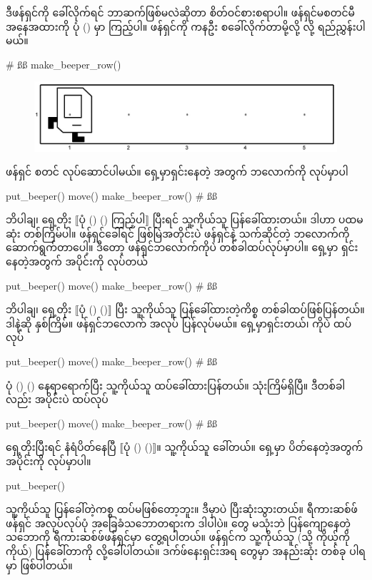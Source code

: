 ဒီဖန်ရှင်ကို ခေါ်လိုက်ရင် ဘာဆက်ဖြစ်မလဲဆိုတာ စိတ်ဝင်စားစရာပါ။  ဖန်ရှင်မစတင်မီ အနေအထားကို ပုံ  (\fRefNo{\ref{fig:mrofb_recur1}}) မှာ ကြည့်ပါ။ ဖန်ရှင်ကို ကနဦး  စခေါ်လိုက်တာမို့လို့  လို့ ရည်ညွှန်းပါမယ်။
%
\begin{py}
# ßß
make_beeper_row()
\end{py}
%
\begin{figure}[htb!]
    {\includegraphics[scale=0.15]{images/ch04/mrofb/before.jpg}}
\caption{}
\label{fig:mrofb_recur1}
\end{figure}

ဖန်ရှင် စတင် လုပ်ဆောင်ပါမယ်။  ရှေ့မှာရှင်းနေတဲ့ အတွက်  ဘလောက်ကို လုပ်မှာပါ
%
\begin{py}
put_beeper()
move()
make_beeper_row() # ßß
\end{py}
%
ဘိပါချ၊ ရှေ့တိုး $\big\llbracket$ပုံ (\fRefNo{\ref{fig:mrofb_recur}}) ()  ကြည့်ပါ$\big\rrbracket$ ပြီးရင် သူ့ကိုယ်သူ  ပြန်ခေါ်ထားတယ်။ ဒါဟာ ပထမဆုံး တစ်ကြိမ်ပါ။ ဖန်ရှင်ခေါ်ရင် ဖြစ်မြဲအတိုင်းပဲ ဖန်ရှင်နဲ့ သက်ဆိုင်တဲ့ ဘလောက်ကို ဆောက်ရွက်တာပေါ့။ ဒီတော့  ဖန်ရှင်ဘလောက်ကိုပဲ တစ်ခါထပ်လုပ်မှာပါ။ ရှေ့မှာ ရှင်းနေတဲ့အတွက်  အပိုင်းကို လုပ်တယ်
%
\begin{py}
put_beeper()
move()
make_beeper_row() # ßß
\end{py}
%
ဘိပါချ၊ ရှေ့တိုး $\big\llbracket$ပုံ (\fRefNo{\ref{fig:mrofb_recur}}) ()$\big\rrbracket$ ပြီး သူ့ကိုယ်သူ ပြန်ခေါ်ထားတဲ့ကိစ္စ တစ်ခါထပ်ဖြစ်ပြန်တယ်။ ဒါနဲ့ဆို နှစ်ကြိမ်။ ဖန်ရှင်ဘလောက် အလုပ် ပြန်လုပ်မယ်။ ရှေ့မှာရှင်းတယ်၊  ကိုပဲ ထပ်လုပ်
%
\begin{py}
put_beeper()
move()
make_beeper_row() # ßß
\end{py}
%
ပုံ (\fRefNo{\ref{fig:mrofb_recur}}) () နေရာရောက်ပြီး သူ့ကိုယ်သူ ထပ်ခေါ်ထားပြန်တယ်။ သုံးကြိမ်ရှိပြီ။ ဒီတစ်ခါလည်း  အပိုင်းပဲ ထပ်လုပ်
%
\begin{py}
put_beeper()
move()
make_beeper_row() # ßß
\end{py}
%
ရှေ့တိုးပြီးရင် နံရံပိတ်နေပြီ $\big\llbracket$ပုံ (\fRefNo{\ref{fig:mrofb_recur}}) ()$\big\rrbracket$။ သူ့ကိုယ်သူ ခေါ်တယ်။ ရှေ့မှာ ပိတ်နေတဲ့အတွက်  အပိုင်းကို လုပ်မှာပါ။
%
\begin{py}
put_beeper()
\end{py}
%
သူ့ကိုယ်သူ ပြန်ခေါ်တဲ့ကစ္စ ထပ်မဖြစ်တော့ဘူး။ ဒီမှာပဲ ပြီးဆုံးသွားတယ်။ ရီကားဆစ်ဖ် ဖန်ရှင် အလုပ်လုပ်ပုံ အခြေခံသဘောတရားက ဒါပါပဲ။  တွေ မသုံးဘဲ ပြန်ကျော့နေတဲ့ သဘောကို ရီကားဆစ်ဖ်ဖန်ရှင်မှာ တွေ့ရပါတယ်။ ဖန်ရှင်က သူ့ကိုယ်သူ (သို့ ကိုယ့်ကိုကိုယ်) ပြန်ခေါ်တာကို  လို့ခေါ်ပါတယ်။ ဒက်ဖ်နေးရှင်းအရ  တွေမှာ  အနည်းဆုံး တစ်ခု ပါရမှာ ဖြစ်ပါတယ်။


